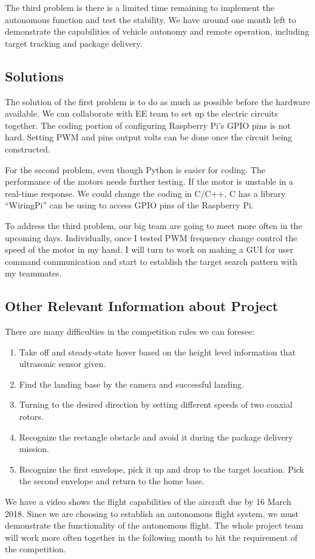 \documentclass[letterpaper, 10, draftclsnofoot, onecolumn,compsoc]{IEEEtran}
\begin{document}
The third problem is there is a limited time remaining to implement the autonomous function and test the stability. We have around one month left to demonstrate the capabilities of vehicle autonomy and remote operation, including target tracking and package delivery.

\subsection{Solutions}
The solution of the first problem is to do as much as possible before the hardware available. We can collaborate with EE team to set up the electric circuits together. The coding portion of configuring Raspberry Pi’s GPIO pins is not hard. Setting PWM and pins output volts can be done once the circuit being constructed.

For the second problem, even though Python is easier for coding. The performance of the motors needs further testing. If the motor is unstable in a real-time response. We could change the coding in C/C++, C has a library “WiringPi” can be using to access GPIO pins of the Raspberry Pi.

To address the third problem, our big team are going to meet more often in the upcoming days. Individually, once I tested PWM frequency change control the speed of the motor in my hand. I will turn to work on making a GUI for user command communication and start to establish the target search pattern with my teammates.

\subsection{Other Relevant Information about Project}
There are many difficulties in the competition rules we can foresee: 
\begin{enumerate}
\item{Take off and steady-state hover based on the height level information that ultrasonic sensor given.}
\item{Find the landing base by the camera and successful landing.}
\item{Turning to the desired direction by setting different speeds of two coaxial rotors.}
\item{Recognize the rectangle obstacle and avoid it during the package delivery mission.}
\item{Recognize the first envelope, pick it up and drop to the target location. Pick the second envelope and return to the home base.}
\end{enumerate}

We have a video shows the flight capabilities of the aircraft due by 16 March 2018. Since we are choosing to establish an autonomous flight system, we must demonstrate the functionality of the autonomous flight. The whole project team will work more often together in the following month to hit the requirement of the competition.
\end{document}
